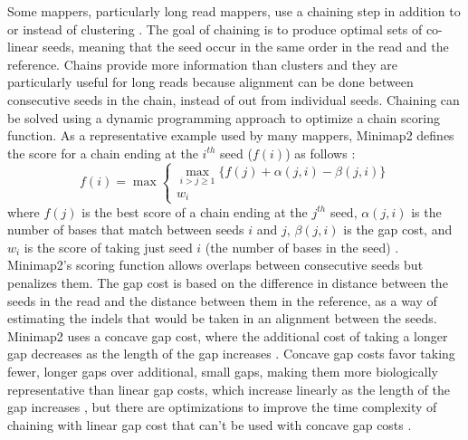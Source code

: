 \documentclass[11pt]{ucscthesis}
\begin{document}
Some mappers, particularly long read mappers, use a chaining step in addition to or instead of clustering \cite{sahlin_survey_2023}.
The goal of chaining is to produce optimal sets of co-linear seeds, meaning that the seed occur in the same order in the read and the reference.
Chains provide more information than clusters and they are particularly useful for long reads because alignment can be done between consecutive seeds in the chain, instead of out from individual seeds.
Chaining can be solved using a dynamic programming approach to optimize a chain scoring function.
As a representative example used by many mappers, Minimap2 defines the score for a chain ending at the $i^{th}$ seed ($f(i)$) as follows \cite{minimap2_2021}:
\begin{equation}
    f(i) = \max\begin{cases}
                \max_{i>j\geq 1} \{f(j) + \alpha(j,i) - \beta(j,i)\}\\
                w_i
                \end{cases}
\end{equation}
where $f(j)$ is the best score of a chain ending at the $j^{th}$ seed, $\alpha(j,i)$ is the number of bases that match between seeds $i$ and $j$, $\beta(j,i)$ is the gap cost, and $w_i$ is the score of taking just seed $i$ (the number of bases in the seed) \cite{minimap2_2021}.
Minimap2's scoring function allows overlaps between consecutive seeds but penalizes them. 
The gap cost is based on the difference in distance between the seeds in the read and the distance between them in the reference, as a way of estimating the indels that would be taken in an alignment between the seeds.
Minimap2 uses a concave gap cost, where the additional cost of taking a longer gap decreases as the length of the gap increases \cite{sahlin_survey_2023}.
Concave gap costs favor taking fewer, longer gaps over additional, small gaps, making them more biologically representative than linear gap costs, which increase linearly as the length of the gap increases \cite{sahlin_survey_2023}, but there are optimizations to improve the time complexity of chaining with linear gap cost that can't be used with concave gap costs \cite{abouelhoda_linear_chaining_2005}.


\end{document}
